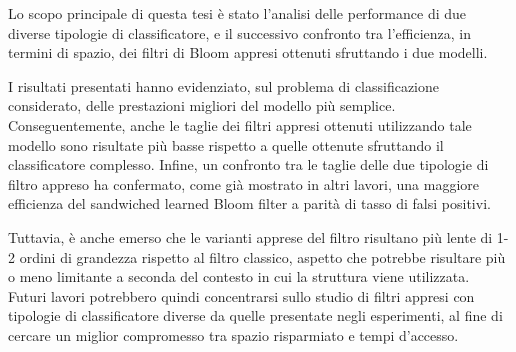 \documentclass[../../main.tex]{subfiles}
\begin{document}
    Lo scopo principale di questa tesi è stato l'analisi delle performance di due diverse tipologie di classificatore, e il successivo confronto tra l'efficienza, in termini di spazio, dei filtri di Bloom appresi ottenuti sfruttando i due modelli. 
    
    I risultati presentati hanno evidenziato, sul problema di classificazione considerato, delle prestazioni migliori del modello più semplice. Conseguentemente, anche le taglie dei filtri appresi ottenuti utilizzando tale modello sono risultate più basse rispetto a quelle ottenute sfruttando il classificatore complesso. Infine, un confronto tra le taglie delle due tipologie di filtro appreso ha confermato, come già mostrato in altri lavori, una maggiore efficienza del sandwiched learned Bloom filter a parità di tasso di falsi positivi.

    Tuttavia, è anche emerso che le varianti apprese del filtro risultano più lente di 1-2 ordini di grandezza rispetto al filtro classico, aspetto che potrebbe risultare più o meno limitante a seconda del contesto in cui la struttura viene utilizzata. Futuri lavori potrebbero quindi concentrarsi sullo studio di filtri appresi con tipologie di classificatore diverse da quelle presentate negli esperimenti, al fine di cercare un miglior compromesso tra spazio risparmiato e tempi d'accesso.
\end{document}
